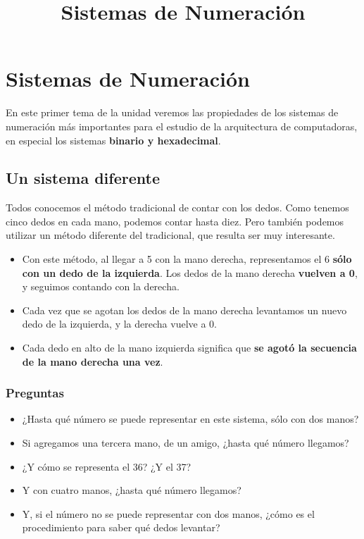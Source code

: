 \documentclass[spanish,A4,]{article}
\title{Sistemas de Numeración}
\begin{document}
\maketitle

\section{Sistemas de Numeración}\label{sistemas-de-numeraciuxf3n}

En este primer tema de la unidad veremos las propiedades de los sistemas
de numeración más importantes para el estudio de la arquitectura de
computadoras, en especial los sistemas \textbf{binario y hexadecimal}.

\subsection{Un sistema diferente}\label{un-sistema-diferente}

Todos conocemos el método tradicional de contar con los dedos. Como
tenemos cinco dedos en cada mano, podemos contar hasta diez. Pero
también podemos utilizar un método diferente del tradicional, que
resulta ser muy interesante.

\begin{itemize}
\itemsep1pt\parskip0pt
\item
  Con este método, al llegar a 5 con la mano derecha, representamos el 6
  \textbf{sólo con un dedo de la izquierda}. Los dedos de la mano
  derecha \textbf{vuelven a 0}, y seguimos contando con la derecha.
\item
  Cada vez que se agotan los dedos de la mano derecha levantamos un
  nuevo dedo de la izquierda, y la derecha vuelve a 0.
\item
  Cada dedo en alto de la mano izquierda significa que \textbf{se agotó
  la secuencia de la mano derecha una vez}.
\end{itemize}

\subsubsection{Preguntas}\label{preguntas}

\begin{itemize}
\itemsep1pt\parskip0pt
\item
  ¿Hasta qué número se puede representar en este sistema, sólo con dos
  manos?
\item
  Si agregamos una tercera mano, de un amigo, ¿hasta qué número
  llegamos?
\item
  ¿Y cómo se representa el 36? ¿Y el 37?
\item
  Y con cuatro manos, ¿hasta qué número llegamos?
\item
  Y, si el número no se puede representar con dos manos, ¿cómo es el
  procedimiento para saber qué dedos levantar?
\end{itemize}
\end{document}
